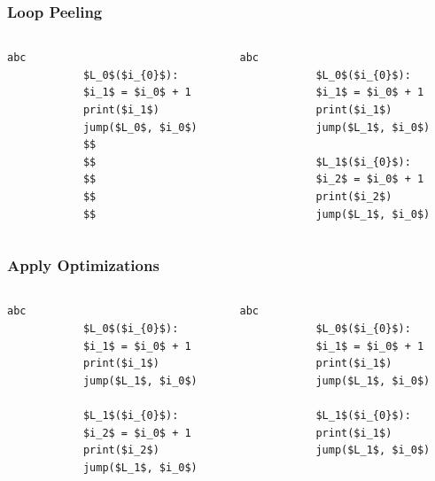 \documentclass[utf8x]{beamer}
\begin{document}
\begin{frame}[fragile]
  \frametitle{Loop Peeling}
    \begin{columns}
    \begin{column}{0.5\textwidth}
      \centering
            \begin{lstlisting}[mathescape]%,numbers = right,basicstyle=\setstretch{1.05}\ttfamily\scriptsize]
            abc
            $L_0$($i_{0}$):
            $i_1$ = $i_0$ + 1
            print($i_1$)
            jump($L_0$, $i_0$)
            $$
            $$
            $$
            $$
            $$
            \end{lstlisting}
    \end{column}
    \pause
    \begin{column}{0.5\textwidth}
      \centering
            \begin{lstlisting}[mathescape]%,numbers = right,basicstyle=\setstretch{1.05}\ttfamily\scriptsize]
            abc
            $L_0$($i_{0}$):
            $i_1$ = $i_0$ + 1
            print($i_1$)
            jump($L_1$, $i_0$)

            $L_1$($i_{0}$):
            $i_2$ = $i_0$ + 1
            print($i_2$)
            jump($L_1$, $i_0$)
            \end{lstlisting}
    \end{column}
  \end{columns}
\end{frame}

\begin{frame}[fragile]
  \frametitle{Apply Optimizations}
    \begin{columns}
    \begin{column}{0.5\textwidth}
      \centering
            \begin{lstlisting}[mathescape]%,numbers = right,basicstyle=\setstretch{1.05}\ttfamily\scriptsize]
            abc
            $L_0$($i_{0}$):
            $i_1$ = $i_0$ + 1
            print($i_1$)
            jump($L_1$, $i_0$)

            $L_1$($i_{0}$):
            $i_2$ = $i_0$ + 1
            print($i_2$)
            jump($L_1$, $i_0$)
            \end{lstlisting}
    \end{column}
    \pause
    \begin{column}{0.5\textwidth}
      \centering
            \begin{lstlisting}[mathescape]%,numbers = right,basicstyle=\setstretch{1.05}\ttfamily\scriptsize]
            abc
            $L_0$($i_{0}$):
            $i_1$ = $i_0$ + 1
            print($i_1$)
            jump($L_1$, $i_0$)

            $L_1$($i_{0}$):
            print($i_1$)
            jump($L_1$, $i_0$)
            \end{lstlisting}
    \end{column}
  \end{columns}
\end{frame}
\end{document}
